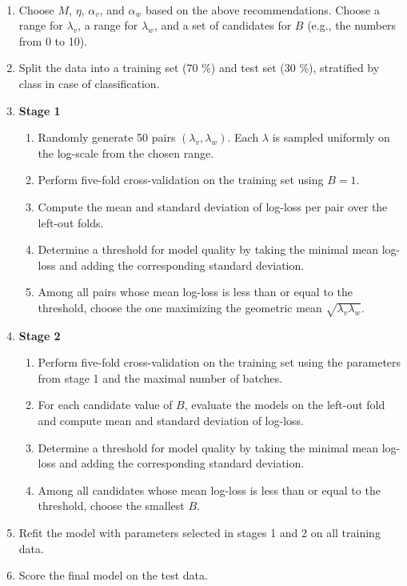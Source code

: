 \begin{algorithm}~
\label{alg_hyperparameters}
\begin{enumerate}
\item Choose $M$, $\eta$, $\alpha_v$, and $\alpha_w$ based on the above recommendations.
Choose a range for $\lambda_v$, a range for $\lambda_w$, and a set of candidates for $B$ (e.g., the numbers from 0 to 10).
%
\item Split the data into a training set (70 \%) and test set (30 \%), stratified by class in case of classification.
%
\item\textbf{Stage 1}
%
\begin{enumerate}
\item Randomly generate 50 pairs $(\lambda_v,\lambda_w)$.
Each $\lambda$ is sampled uniformly on the log-scale from the chosen range.
%
\item Perform five-fold cross-validation on the training set using $B=1$.
%
\item Compute the mean and standard deviation of log-loss per pair over the left-out folds.
%
\item Determine a threshold for model quality by taking the minimal mean log-loss and adding the corresponding standard deviation.
%
\item Among all pairs whose mean log-loss is less than or equal to the threshold, choose the one maximizing the geometric mean $\sqrt{\lambda_v\lambda_w}$.
\end{enumerate}
%
\item\textbf{Stage 2}
\begin{enumerate}
\item Perform five-fold cross-validation on the training set using the parameters from stage 1 and the maximal number of batches.
%
\item For each candidate value of $B$, evaluate the models on the left-out fold and compute mean and standard deviation of log-loss.
%
\item Determine a threshold for model quality by taking the minimal mean log-loss and adding the corresponding standard deviation.
%
\item Among all candidates whose mean log-loss is less than or equal to the threshold, choose the smallest $B$.
\end{enumerate}
%
\item Refit the model with parameters selected in stages 1 and 2 on all training data.
%
\item Score the final model on the test data.
\end{enumerate}
\end{algorithm}
